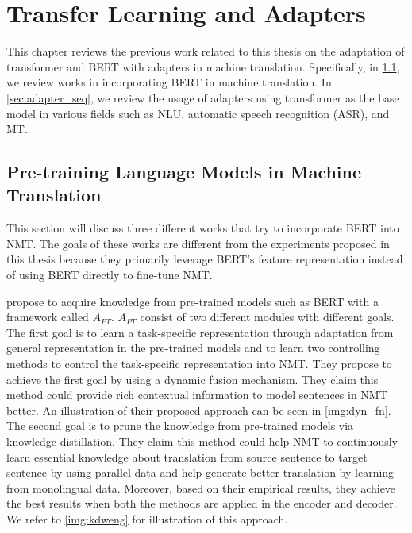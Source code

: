 \chapter{Transfer Learning and Adapters}

This chapter reviews the previous work related to this thesis on the adaptation of transformer and BERT with adapters in machine translation. Specifically, in \cref{sec:prelm_mt}, we review works in incorporating BERT in machine translation. In \cref{sec:adapter_seq}, we review the usage of adapters using transformer as the base model in various fields such as NLU, automatic speech recognition (ASR), and MT.

\section{Pre-training Language Models in Machine Translation}
\label{sec:prelm_mt}

This section will discuss three different works that try to incorporate BERT into NMT. The goals of these works are different from the experiments proposed in this thesis because they primarily leverage BERT's feature representation instead of using BERT directly to fine-tune NMT.

 propose to acquire knowledge from pre-trained models such as BERT with a framework called $A_{PT}$. $A_{PT}$ consist of two different modules with different goals. The first goal is to learn a task-specific representation through adaptation from general representation in the pre-trained models and to learn two controlling methods to control the task-specific representation into NMT. They propose to achieve the first goal by using a dynamic fusion mechanism. They claim this method could provide rich contextual information to model sentences in NMT better. An illustration of their proposed approach can be seen in \cref{img:dyn_fn}. The second goal is to prune the knowledge from pre-trained models via knowledge distillation. They claim this method could help NMT to continuously learn essential knowledge about translation from source sentence to target sentence by using parallel data and help generate better translation by learning from monolingual data. Moreover, based on their empirical results, they achieve the best results when both the methods are applied in the encoder and decoder. We refer to \cref{img:kdweng} for illustration of this approach.

